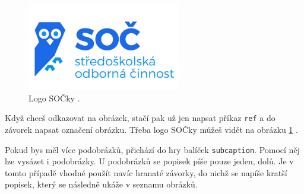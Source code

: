 \documentclass[12pt, a4paper,
    twoside,        %
    openright
]{report}
\begin{document}
\begin{figure}
    \centering %
    \includegraphics[width=0.6\textwidth]{imgs/soc-logo.jpg} %
    \caption{Logo SOČky \cite{socLogo}.} %
    \label{fig:logoSOC} %
\end{figure}

Když chceš odkazovat na obrázek, stačí pak už jen napsat příkaz \texttt{ref} a do závorek napsat označení obrázku. Třeba logo SOČky můžeš vidět na obrázku \ref{fig:logoSOC} \cite{socLogo}.

Pokud bys měl více podobrázků, přichází do hry balíček \texttt{subcaption}. Pomocí něj lze vysázet i podobrázky. U podobrázků se popisek píše pouze jeden, dolů. Je v tomto případě vhodné použít navíc hranaté závorky, do nichž se napíše kratší popisek, který se následně ukáže v seznamu obrázků.
\end{document}
